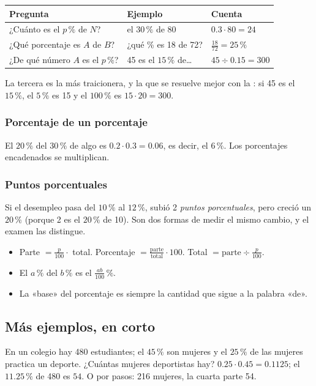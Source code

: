 \begin{center}
\begin{tabular}{@{}lll@{}}
\toprule
\textbf{Pregunta} & \textbf{Ejemplo} & \textbf{Cuenta}\\\midrule
¿Cuánto es el $p\,\%$ de $N$? & el $30\,\%$ de 80 & $0.3 \cdot 80 = 24$\\
¿Qué porcentaje es $A$ de $B$? & ¿qué \% es 18 de 72? & $\tfrac{18}{72} = 25\,\%$\\
¿De qué número $A$ es el $p\,\%$? & 45 es el $15\,\%$ de… & $45 \div 0.15 = 300$\\
\bottomrule
\end{tabular}
\end{center}

La tercera es la más traicionera, y la que se resuelve mejor con la : si 45 es el
$15\,\%$, el $5\,\%$ es 15 y el $100\,\%$ es $15 \cdot 20 = 300$.

\subsubsection{Porcentaje de un porcentaje}
El $20\,\%$ del $30\,\%$ de algo es $0.2 \cdot 0.3 = 0.06$, es decir, el $6\,\%$. Los porcentajes encadenados se
multiplican.

\subsubsection{Puntos porcentuales}
Si el desempleo pasa del $10\,\%$ al $12\,\%$, subió 2 \emph{puntos porcentuales}, pero creció un $20\,\%$
(porque 2 es el $20\,\%$ de 10). Son dos formas de medir el mismo cambio, y el examen las distingue.


\begin{regla}
\begin{itemize}
  \item Parte $= \tfrac{p}{100}\cdot$ total. Porcentaje $= \tfrac{\text{parte}}{\text{total}}\cdot 100$.
  Total $= \text{parte} \div \tfrac{p}{100}$.
  \item El $a\,\%$ del $b\,\%$ es el $\tfrac{ab}{100}\,\%$.
  \item La «base» del porcentaje es siempre la cantidad que sigue a la palabra «de».
\end{itemize}
\end{regla}

\subsection{Más ejemplos, en corto}
\begin{ejemplo}
En un colegio hay 480 estudiantes; el $45\,\%$ son mujeres y el $25\,\%$ de las mujeres practica un deporte. ¿Cuántas
mujeres deportistas hay?
\solucion $0.25 \cdot 0.45 = 0.1125$; el $11.25\,\%$ de 480 es $54$. O por pasos: 216 mujeres, la cuarta parte 54.
\end{ejemplo}

